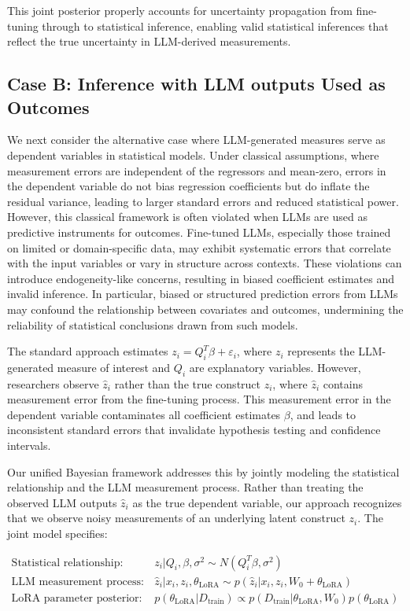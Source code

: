 \documentclass[11pt]{article}
\begin{document}
This joint posterior properly accounts for uncertainty propagation from fine-tuning through to statistical inference, enabling valid statistical inferences that reflect the true uncertainty in LLM-derived measurements.

\subsection{Case B: Inference with LLM outputs Used as Outcomes}

We next consider the alternative case where LLM-generated measures serve as dependent variables in statistical models. Under classical assumptions, where measurement errors are independent of the regressors and mean-zero, errors in the dependent variable do not bias regression coefficients but do inflate the residual variance, leading to larger standard errors and reduced statistical power. However, this classical framework is often violated when LLMs are used as predictive instruments for outcomes. Fine-tuned LLMs, especially those trained on limited or domain-specific data, may exhibit systematic errors that correlate with the input variables or vary in structure across contexts. These violations can introduce endogeneity-like concerns, resulting in biased coefficient estimates and invalid inference. In particular, biased or structured prediction errors from LLMs may confound the relationship between covariates and outcomes, undermining the reliability of statistical conclusions drawn from such models.

The standard approach estimates $z_i = Q_i^T\beta + \varepsilon_i$, where $z_i$ represents the LLM-generated measure of interest and $Q_i$ are explanatory variables. However, researchers observe $\hat{z}_i$ rather than the true construct $z_i$, where $\hat{z}_i$ contains measurement error from the fine-tuning process. This measurement error in the dependent variable contaminates all coefficient estimates $\beta$, and leads to inconsistent standard errors that invalidate hypothesis testing and confidence intervals.

Our unified Bayesian framework addresses this by jointly modeling the statistical relationship and the LLM measurement process. Rather than treating the observed LLM outputs $\hat{z}_i$ as the true dependent variable, our approach recognizes that we observe noisy measurements of an underlying latent construct $z_i$. The joint model specifies:

\begin{align}
\text{Statistical relationship:} \quad &z_i|Q_i, \beta, \sigma^2 \sim N(Q_i^T\beta, \sigma^2) \label{eq:stat_relationship} \\
\text{LLM measurement process:} \quad &\hat{z}_i|x_i, z_i, \theta_{\text{LoRA}} \sim p(\hat{z}_i|x_i, z_i, W_0 + \theta_{\text{LoRA}}) \label{eq:llm_measurement} \\
\text{LoRA parameter posterior:} \quad &p(\theta_{\text{LoRA}}|D_{\text{train}}) \propto p(D_{\text{train}}|\theta_{\text{LoRA}}, W_0)p(\theta_{\text{LoRA}}) \label{eq:lora_posterior2}
\end{align}
\end{document}
